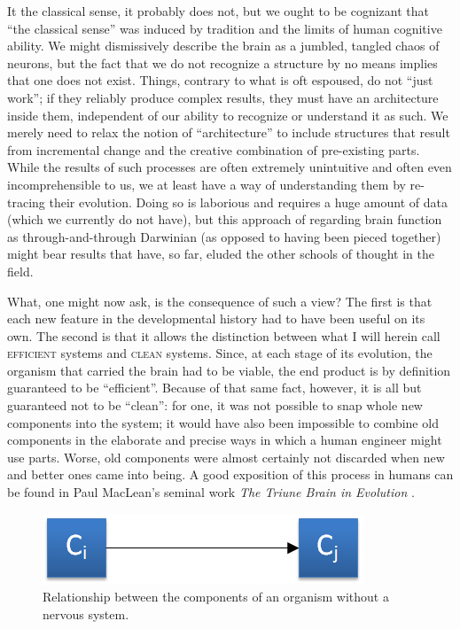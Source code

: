 It the classical sense, it probably does not, but we ought to be cognizant that ``the classical sense'' was induced by tradition and the limits of human cognitive ability. We might dismissively describe the brain as a jumbled, tangled chaos of neurons, but the fact that we do not recognize a structure by no means implies that one does not exist. Things, contrary to what is oft espoused, do not ``just work''; if they reliably produce complex results, they must have an architecture inside them, independent of our ability to recognize or understand it as such. We merely need to relax the notion of ``architecture'' to include structures that result from incremental change and the creative combination of pre-existing parts. While the results of such processes are often extremely unintuitive and often even incomprehensible to us, we at least have a way of understanding them by re-tracing their evolution. Doing so is laborious and requires a huge amount of data (which we currently do not have), but this approach of regarding brain function as through-and-through Darwinian (as opposed to having been pieced together) might bear results that have, so far, eluded the other schools of thought in the field.

What, one might now ask, is the consequence of such a view? The first is that each new feature in the developmental history had to have been useful on its own. The second is that it allows the distinction between what I will herein call \textsc{efficient} systems and \textsc{clean} systems. Since, at each stage of its evolution, the organism that carried the brain had to be viable, the end product is by definition guaranteed to be ``efficient''. Because of that same fact, however, it is all but guaranteed not to be ``clean'': for one, it was not possible to snap whole new components into the system; it would have also been impossible to combine old components in the elaborate and precise ways in which a human engineer might use parts. Worse, old components were almost certainly not discarded when new and better ones came into being. A good exposition of this process in humans can be found in Paul MacLean's seminal work {\em The Triune Brain in Evolution} \cite{maclean1990}.

\begin{figure}[!h]
	\centering
	\includegraphics{figs/noNervousSystem.png}
	\caption{Relationship between the components of an organism without a nervous system.}
	\label{fig:noNervousSystem}
\end{figure}
